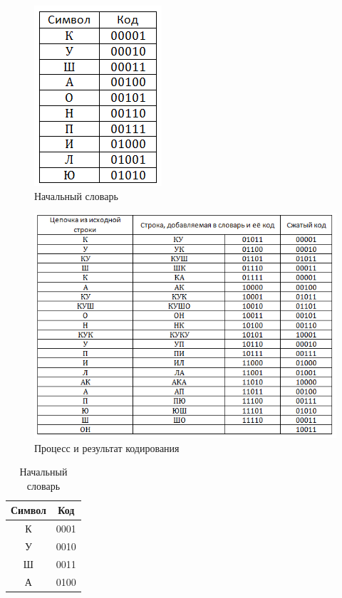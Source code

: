 \begin{figure}[H]
	\begin{center}
		\includegraphics[scale=1]{../pics/LZW/dictionary.png}
		\caption{Начальный словарь} 
		\label{pic:lzw:dictionary}
	\end{center}
\end{figure}

\begin{figure}[H]
	\begin{center}
		\includegraphics[scale=1]{../pics/LZW/result.png}
		\caption{Процесс и результат кодирования}
		\label{pic:lzw:result}
	\end{center}
\end{figure}

\renewcommand{\arraystretch}{1.5}
\begin{table}[H]
\begin{center}
	\begin{tabular}{|c|c|}
		\hline	
		Символ & Код \\
		\hline
		  К    & 0001 \\
		\hline
		  У	   & 0010 \\
		\hline  
	  	  Ш	   & 0011 \\
		\hline  	
		  А    & 0100 \\
		\hline
	\end{tabular}
	\caption{Начальный словарь} 
	\label{table:lzw:dictionary}
\end{center}
\end{table}


